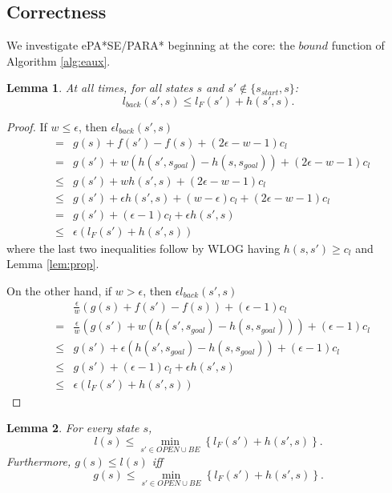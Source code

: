 \documentclass[letterpaper]{article}
\newtheorem{lemma}{Lemma}
\begin{document}
\subsection{Correctness}

We investigate ePA*SE/PARA* beginning at the core: the $bound$ function of Algorithm \ref{alg:eaux}.

\begin{lemma}
\label{lem:indep}
At all times, for all states $s$ and $s'\notin \{s_{start},s\}$:
\[l_{back}(s',s) \le l_F(s') + h(s',s).\]
\end{lemma}

\begin{proof}
If $w \le \epsilon$, then $\epsilon l_{back}(s',s)$
\begin{eqnarray*}
&=&g(s) + f(s') - f(s) + (2\epsilon-w-1)c_l
\\&=& g(s') + w(h(s',s_{goal}) - h(s,s_{goal})) + (2\epsilon-w-1)c_l
\\&\le& g(s') + wh(s',s) + (2\epsilon-w-1)c_l
\\&\le& g(s') + \epsilon h(s',s) + (w-\epsilon)c_l + (2\epsilon-w-1)c_l
\\&=& g(s') + (\epsilon-1)c_l + \epsilon h(s',s)
\\&\le& \epsilon(l_F(s') +  h(s',s))
\end{eqnarray*}
where the last two inequalities follow by WLOG having $h(s,s') \ge c_l$ and Lemma \ref{lem:prop}.

On the other hand, if $w > \epsilon$, then $\epsilon l_{back}(s',s)$
\begin{eqnarray*}
&&\frac\epsilon w\left(g(s) + f(s') - f(s)\right) + (\epsilon-1)c_l
\\&=& \frac\epsilon w\left(g(s') + w(h(s',s_{goal}) - h(s,s_{goal})) \right) + (\epsilon-1)c_l
\\&\le& g(s') + \epsilon(h(s',s_{goal}) - h(s,s_{goal})) + (\epsilon-1)c_l
\\&\le& g(s') + (\epsilon-1)c_l + \epsilon h(s',s)
\\&\le& \epsilon(l_F(s') +  h(s',s))
\end{eqnarray*}
\end{proof}

\begin{lemma}
\label{lem:bound}
For every state $s$,
\[l(s) \le \min_{s'\in OPEN \cup BE} \left\{ l_F(s') + h(s',s) \right\}.\]
Furthermore, $g(s) \le l(s)$ iff
\[g(s) \le \min_{s'\in OPEN \cup BE} \left\{ l_F(s') + h(s',s) \right\}.\]
\end{lemma}
\end{document}
